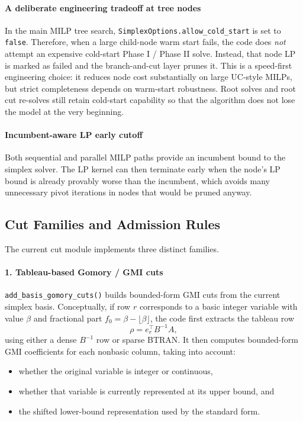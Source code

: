 \paragraph{A deliberate engineering tradeoff at tree nodes}
In the main MILP tree search, \texttt{SimplexOptions.allow\_cold\_start} is set to \texttt{false}. Therefore, when a large child-node warm start fails, the code does \emph{not} attempt an expensive cold-start Phase I / Phase II solve. Instead, that node LP is marked as failed and the branch-and-cut layer prunes it.
This is a speed-first engineering choice: it reduces node cost substantially on large UC-style MILPs, but strict completeness depends on warm-start robustness. Root solves and root cut re-solves still retain cold-start capability so that the algorithm does not lose the model at the very beginning.

\paragraph{Incumbent-aware LP early cutoff}
Both sequential and parallel MILP paths provide an incumbent bound to the simplex solver. The LP kernel can then terminate early when the node's LP bound is already provably worse than the incumbent, which avoids many unnecessary pivot iterations in nodes that would be pruned anyway.

\subsection{Cut Families and Admission Rules}

The current cut module implements three distinct families.

\paragraph{1. Tableau-based Gomory / GMI cuts}
\texttt{add\_basis\_gomory\_cuts()} builds bounded-form GMI cuts from the current simplex basis. Conceptually, if row \(r\) corresponds to a basic integer variable with value \(\beta\) and fractional part
\(f_0 = \beta - \lfloor \beta \rfloor\), the code first extracts the tableau row
\begin{equation}
  \rho = e_r^\top B^{-1} A,
\end{equation}
using either a dense \(B^{-1}\) row or sparse BTRAN. It then computes bounded-form GMI coefficients for each nonbasic column, taking into account:
\begin{itemize}
  \item whether the original variable is integer or continuous,
  \item whether that variable is currently represented at its upper bound, and
  \item the shifted lower-bound representation used by the standard form.
\end{itemize}

